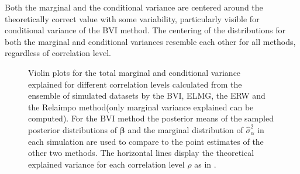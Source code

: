 Both the marginal and the conditional variance are centered around the theoretically correct value with some variability, particularly visible for conditional variance of the BVI method. 
The centering of the distributions for both the marginal and conditional variances resemble each other for all methods, regardless of correlation level.
\begin{figure}[!ht]
  \centering
  \hfill
  \caption{Violin plots for the total marginal and conditional variance explained for different correlation levels calculated from the ensemble of simulated datasets by the BVI, ELMG, the ERW and the Relaimpo method(only marginal variance explained can be computed). For the BVI method the posterior means of the sampled posterior distributions of $\boldsymbol{\beta}$ and the marginal distribution of $\hat{\sigma}^2_{\alpha}$ in each simulation are used to compare to the point estimates of the other two methods. The horizontal lines display the theoretical explained variance for each correlation level $\rho$ as in .}
  \label{fig:total_variance}
\end{figure}

\newpage

